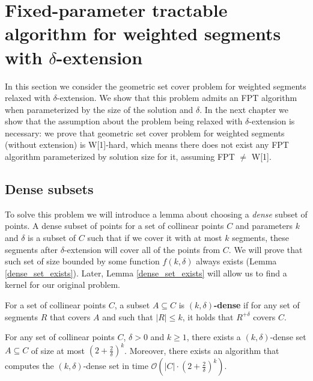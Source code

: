 \section{Fixed-parameter tractable algorithm for weighted segments with $\delta$-extension}
\label{section:fpt_weighted}

In this section we consider the geometric set cover problem
for weighted segments relaxed with $\delta$-extension.
We show that this problem
admits an FPT algorithm when parameterized by the size
of the solution and $\delta$.
In the next chapter we show that the assumption
about the problem being relaxed with $\delta$-extension is necessary:
we prove that geometric set cover problem
for weighted segments (without extension) is W[1]-hard, which means
there does not exist any FPT algorithm parameterized by solution size for it,
assuming FPT $\neq$ W[1].

\fptWeightedSegment*

\subsection{Dense subsets}

To solve this problem we will introduce a lemma about choosing
a \textit{dense} subset of points. A dense subset of points
for a set of collinear points $C$ and parameters $k$ and $\delta$
is a subset of $C$ such that
if we cover it with at most $k$ segments,
these segments after $\delta$-extension will cover all of the points from $C$.
We will prove that such set 
of size bounded by some function $f(k, \delta)$
always exists (Lemma \ref{dense_set_exists}).
Later, Lemma \ref{dense_set_exists} will allow us to find a kernel
for our original problem.

\begin{defi}
	For a set of collinear points $C$,
	a subset $A \subseteq C$ is \textbf{$(k,\delta)$-dense} 
	if for any set of segments $R$ that covers $A$ and
	such that $|R| \le k$, it holds that $R^{+\delta}$ covers $C$.
\end{defi}

\begin{lemma}
	\label{dense_set_exists}
	For any set of collinear points $C$, $\delta > 0$ and $k \ge 1$,
	there exists a $(k,\delta)$-dense set $A \subseteq C$ of size
	at most $(2+\frac{2}{\delta})^k$.
	Moreover, there exists an algorithm that computes the $(k,\delta)$-dense set
	in time $\mathcal{O}(|C| \cdot (2+\frac{2}{\delta})^k)$.
\end{lemma}

